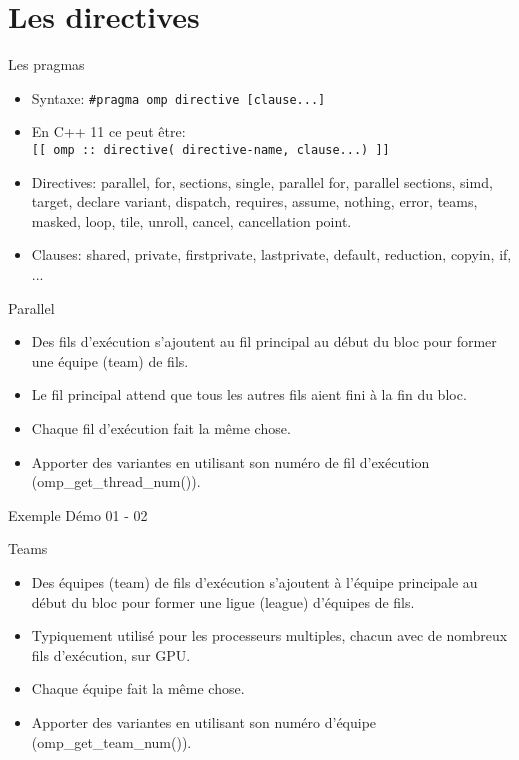 \documentclass[10pt]{beamer}
\begin{document}
\section{Les directives}

\begin{frame}[fragile]{Les pragmas}

  \begin{itemize}
    \item Syntaxe: \texttt{\#pragma omp directive [clause...]}
    \item En C++ 11 ce peut être: \\\texttt{[[ omp :: directive( directive-name, clause...) ]]}
    \item Directives: parallel, for, sections, single, parallel for, parallel sections, simd, target, declare variant, dispatch, requires, assume, nothing, error, teams, masked, loop, tile, unroll, cancel, cancellation point.
    \item Clauses: shared, private, firstprivate, lastprivate, default, reduction, copyin, if, ...
  \end{itemize}
\end{frame}

\begin{frame}[fragile]{Parallel}

  \begin{itemize}
    \item Des fils d'exécution s'ajoutent au fil principal au début du bloc pour former une équipe (team) de fils.

    \item Le fil principal attend que tous les autres fils aient fini à la fin du bloc.

    \item Chaque fil d'exécution fait la même chose.

    \item Apporter des variantes en utilisant son numéro de fil d'exécution (omp\_get\_thread\_num()).
    
  \end{itemize}
\end{frame}

\begin{frame}[fragile]{Exemple}
Démo 01 - 02
\end{frame}

\begin{frame}[fragile]{Teams}

  \begin{itemize}
    \item Des équipes (team) de fils d'exécution s'ajoutent à l'équipe principale au début du bloc pour former une ligue (league) d'équipes de fils.
    \item Typiquement utilisé pour les processeurs multiples, chacun avec de nombreux fils d'exécution, sur GPU.
    \item Chaque équipe fait la même chose.
    \item Apporter des variantes en utilisant son numéro d'équipe (omp\_get\_team\_num()).
  \end{itemize}
\end{frame}
\end{document}
